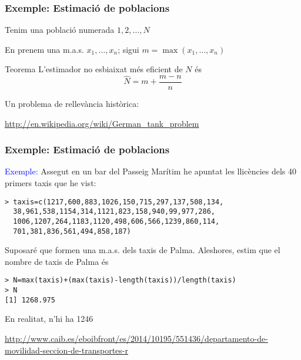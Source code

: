\documentclass[12pt,t]{beamer}
\newcommand{\blue}[1]{\textcolor{blue}{#1}}
\theoremstyle{plain}
\theoremstyle{definition}
\begin{document}
\begin{frame}
\frametitle{Exemple: Estimació de poblacions}

Tenim una població numerada $1,2,\ldots,N$\medskip

En prenem una m.a.s. $x_1,\ldots,x_n$; sigui
$m=\max(x_1,\ldots,x_n)$
\medskip

\begin{block}{Teorema}
L'estimador no esbiaixat més eficient de $N$ és
$$
\widehat{N}=m+\frac{m-n}{n}
$$
\end{block}
\bigskip


Un problema de rellevància històrica:

{\scriptsize \url{http://en.wikipedia.org/wiki/German_tank_problem}}

\end{frame}



\begin{frame}[fragile]
\frametitle{Exemple: Estimació de poblacions}
\vspace*{-2ex}

\blue{Exemple:}
Assegut en un bar del Passeig Marítim he apuntat les llicències dels 40 primers taxis que he vist:
\vspace*{-1ex}

{\footnotesize
\begin{verbatim}
> taxis=c(1217,600,883,1026,150,715,297,137,508,134,
  38,961,538,1154,314,1121,823,158,940,99,977,286,
  1006,1207,264,1183,1120,498,606,566,1239,860,114,
  701,381,836,561,494,858,187)
\end{verbatim}
}
\vspace*{-1ex}

Suposaré que formen una m.a.s. dels taxis de Palma. Aleshores, estim que el nombre de taxis de Palma 
és
\vspace*{-1ex}

{\footnotesize
\begin{verbatim}
> N=max(taxis)+(max(taxis)-length(taxis))/length(taxis)
> N
[1] 1268.975
\end{verbatim}
}
\vspace*{-1ex}

En realitat, n'hi ha 1246 
\medskip

{\scriptsize \url{http://www.caib.es/eboibfront/es/2014/10195/551436/departamento-de-movilidad-seccion-de-transportes-r}

}


\end{frame}
\end{document}
